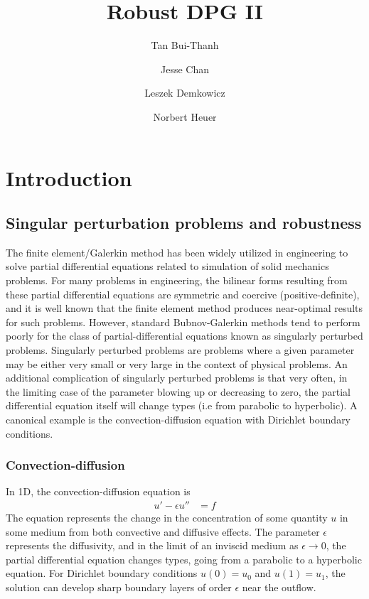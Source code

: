 \documentclass[11pt,onecolumn]{scrartcl}
\author{Tan Bui-Thanh \and Jesse Chan \and Leszek Demkowicz \and Norbert Heuer}
\title{Robust DPG II}
\date{}
\begin{document}
\tableofcontents
\maketitle

\section{Introduction}

\subsection{Singular perturbation problems and robustness}

The finite element/Galerkin method has been widely utilized in engineering to solve partial differential equations related to simulation of solid mechanics problems. For many problems in engineering, the bilinear forms resulting from these partial differential equations are symmetric and coercive (positive-definite), and it is well known that the finite element method produces near-optimal results for such problems. However, standard Bubnov-Galerkin methods tend to perform poorly for the class of partial-differential equations known as singularly perturbed problems. Singularly perturbed problems are problems where a given parameter may be either very small or very large in the context of physical problems.  An additional complication of singularly perturbed problems is that very often, in the limiting case of the parameter blowing up or decreasing to zero, the partial differential equation itself will change types (i.e from parabolic to hyperbolic). A canonical example is the convection-diffusion equation with Dirichlet boundary conditions. 

\subsubsection{Convection-diffusion}

In 1D, the convection-diffusion equation is
\begin{align*}
u'-\epsilon u'' &= f
\end{align*}
The equation represents the change in the concentration of some quantity $u$ in some medium from both convective and diffusive effects. The parameter $\epsilon$ represents the diffusivity, and in the limit of an inviscid medium as $\epsilon\rightarrow 0$, the partial differential equation changes types, going from a parabolic to a hyperbolic equation. For Dirichlet boundary conditions $u(0)=u_0$ and $u(1)= u_1$, the solution can develop sharp boundary layers of order $\epsilon$ near the outflow. 
\end{document}
